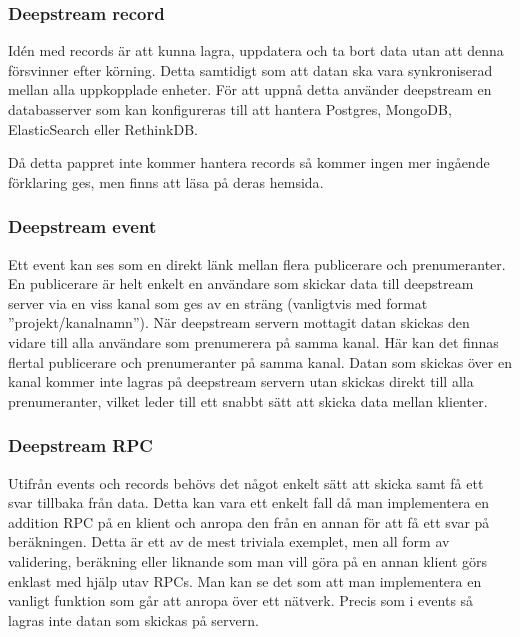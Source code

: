 \subsubsection{Deepstream record}
Idén med records\cite{ds:record} är att kunna lagra, uppdatera och ta bort data utan att denna försvinner efter körning. Detta samtidigt som att datan ska vara synkroniserad mellan alla uppkopplade enheter. För att uppnå detta använder deepstream en databasserver som kan konfigureras till att hantera Postgres, MongoDB, ElasticSearch eller RethinkDB. 

Då detta pappret inte kommer hantera records så kommer ingen mer ingående förklaring ges, men finns att läsa på deras hemsida\cite{ds-storingdata}.

\subsubsection{Deepstream event}
Ett event\cite{ds:event} kan ses som en direkt länk mellan flera publicerare och prenumeranter. En publicerare är helt enkelt en användare som skickar data till deepstream server via en viss kanal som ges av en sträng (vanligtvis med format ''projekt/kanalnamn''). När deepstream servern mottagit datan skickas den vidare till alla användare som prenumerera på samma kanal. Här kan det finnas flertal publicerare och prenumeranter på samma kanal. Datan som skickas över en kanal kommer inte lagras på deepstream servern utan skickas direkt till alla prenumeranter, vilket leder till ett snabbt sätt att skicka data mellan klienter.

\subsubsection{Deepstream RPC}
Utifrån events och records behövs det något enkelt sätt att skicka samt få ett svar tillbaka från data. Detta kan vara ett enkelt fall då man implementera en addition RPC\cite{ds:rpc} på en klient och anropa den från en annan för att få ett svar på beräkningen. Detta är ett av de mest triviala exemplet, men all form av validering, beräkning eller liknande som man vill göra på en annan klient görs enklast med hjälp utav RPCs. Man kan se det som att man implementera en vanligt funktion som går att anropa över ett nätverk. Precis som i events så lagras inte datan som skickas på servern.

